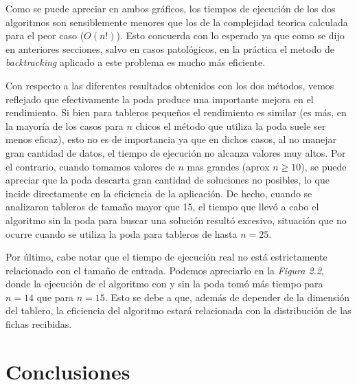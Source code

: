 \documentclass[a4paper,10pt] {article}
\begin{document}
% 

Como se puede apreciar en ambos gr\'aficos, los tiempos de ejecuci\'on de los dos algoritmos son sensiblemente menores que los de la complejidad teorica calculada para el peor caso ($O(n!)$). Esto concuerda con lo esperado ya que como se dijo en anteriores secciones, salvo en casos patol\'ogicos, en la pr\'actica el metodo de \textit{backtracking} aplicado a este problema es mucho m\'as eficiente.

Con respecto a las diferentes resultados obtenidos con los dos m\'etodos, vemos reflejado que efectivamente la poda produce una importante mejora en el rendimiento. Si bien para tableros peque\~{n}os el rendimiento es similar (es m\'as, en la mayor\'ia de los casos para $n$ chicos el m\'etodo que utiliza la poda suele ser menos eficaz), esto no es de importancia ya que en dichos casos, al no manejar gran cantidad de datos, el tiempo de ejecuci\'on no alcanza valores muy altos. Por el contrario, cuando tomamos valores de $n$ mas grandes (aprox $n\geq10$), se puede apreciar que la poda descarta gran cantidad de soluciones no posibles, lo que incide directamente en la eficiencia de la aplicaci\'on. De hecho, cuando se analizaron tableros de tama\~{n}o mayor que 15, el tiempo que llev\'o a cabo el algoritmo sin la poda para buscar una soluci\'on result\'o excesivo, situaci\'on que no ocurre cuando se utiliza la poda para tableros de hasta $n=25$.

Por \'ultimo, cabe notar que el tiempo de ejecuci\'on real no est\'a estrictamente relacionado con el tama\~{n}o de entrada. Podemos apreciarlo en la \textit{Figura 2.2}, donde la ejecuci\'on de el algoritmo con y sin la poda tom\'o m\'as tiempo para $n=14$ que para $n=15$. Esto se debe a que, adem\'as de depender de la dimensi\'on del tablero, la eficiencia del algoritmo estar\'a relacionada con la distribuci\'on de las fichas recibidas.

\section*{Conclusiones}
\end{document}
